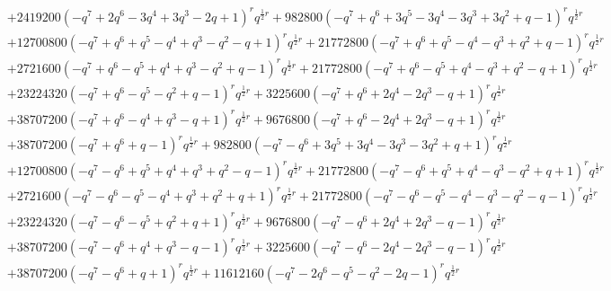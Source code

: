 \documentclass[11pt,english]{amsart}
\numberwithin{equation}{section}
\numberwithin{figure}{section}
\theoremstyle{plain}
\theoremstyle{plain}
\theoremstyle{definition}
\theoremstyle{remark}
\begin{document}
{\begin{align*}
& + 2419200  {\left(-q^{7} + 2  q^{6} - 3  q^{4} + 3  q^{3} - 2  q + 1\right)}^{r} q^{\frac{1}{2}  r} + 982800  {\left(-q^{7} + q^{6} + 3  q^{5} - 3  q^{4} - 3  q^{3} + 3  q^{2} + q - 1\right)}^{r} q^{\frac{1}{2}  r} \\
& + 12700800  {\left(-q^{7} + q^{6} + q^{5} - q^{4} + q^{3} - q^{2} - q + 1\right)}^{r} q^{\frac{1}{2}  r} + 21772800  {\left(-q^{7} + q^{6} + q^{5} - q^{4} - q^{3} + q^{2} + q - 1\right)}^{r} q^{\frac{1}{2}  r} \\
& + 2721600  {\left(-q^{7} + q^{6} - q^{5} + q^{4} + q^{3} - q^{2} + q - 1\right)}^{r} q^{\frac{1}{2}  r} + 21772800  {\left(-q^{7} + q^{6} - q^{5} + q^{4} - q^{3} + q^{2} - q + 1\right)}^{r} q^{\frac{1}{2}  r} \\
& + 23224320  {\left(-q^{7} + q^{6} - q^{5} - q^{2} + q - 1\right)}^{r} q^{\frac{1}{2}  r} + 3225600  {\left(-q^{7} + q^{6} + 2  q^{4} - 2  q^{3} - q + 1\right)}^{r} q^{\frac{1}{2}  r} \\
& + 38707200  {\left(-q^{7} + q^{6} - q^{4} + q^{3} - q + 1\right)}^{r} q^{\frac{1}{2}  r} + 9676800  {\left(-q^{7} + q^{6} - 2  q^{4} + 2  q^{3} - q + 1\right)}^{r} q^{\frac{1}{2}  r} \\
& + 38707200  {\left(-q^{7} + q^{6} + q - 1\right)}^{r} q^{\frac{1}{2}  r} + 982800  {\left(-q^{7} - q^{6} + 3  q^{5} + 3  q^{4} - 3  q^{3} - 3  q^{2} + q + 1\right)}^{r} q^{\frac{1}{2}  r} \\
& + 12700800  {\left(-q^{7} - q^{6} + q^{5} + q^{4} + q^{3} + q^{2} - q - 1\right)}^{r} q^{\frac{1}{2}  r} + 21772800  {\left(-q^{7} - q^{6} + q^{5} + q^{4} - q^{3} - q^{2} + q + 1\right)}^{r} q^{\frac{1}{2}  r} \\
& + 2721600  {\left(-q^{7} - q^{6} - q^{5} - q^{4} + q^{3} + q^{2} + q + 1\right)}^{r} q^{\frac{1}{2}  r} + 21772800  {\left(-q^{7} - q^{6} - q^{5} - q^{4} - q^{3} - q^{2} - q - 1\right)}^{r} q^{\frac{1}{2}  r} \\
& + 23224320  {\left(-q^{7} - q^{6} - q^{5} + q^{2} + q + 1\right)}^{r} q^{\frac{1}{2}  r} + 9676800  {\left(-q^{7} - q^{6} + 2  q^{4} + 2  q^{3} - q - 1\right)}^{r} q^{\frac{1}{2}  r} \\
& + 38707200  {\left(-q^{7} - q^{6} + q^{4} + q^{3} - q - 1\right)}^{r} q^{\frac{1}{2}  r} + 3225600  {\left(-q^{7} - q^{6} - 2  q^{4} - 2  q^{3} - q - 1\right)}^{r} q^{\frac{1}{2}  r} \\
& + 38707200  {\left(-q^{7} - q^{6} + q + 1\right)}^{r} q^{\frac{1}{2}  r} + 11612160  {\left(-q^{7} - 2  q^{6} - q^{5} - q^{2} - 2  q - 1\right)}^{r} q^{\frac{1}{2}  r} \\

\end{align*}}
\end{document}
